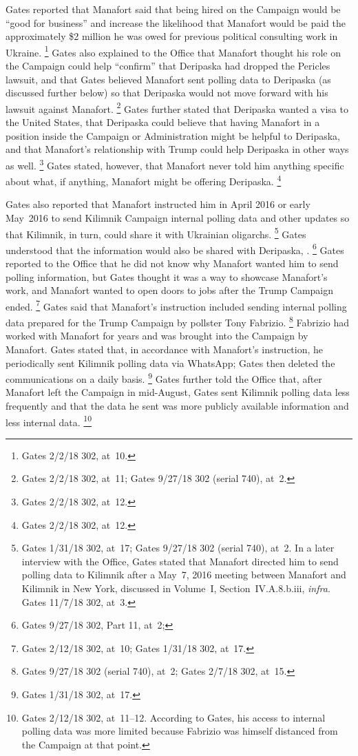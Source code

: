 Gates reported that Manafort said that being hired on the Campaign would be ``good for business'' and increase the likelihood that Manafort would be paid the approximately \$2 million he was owed for previous political consulting work in Ukraine.%
\footnote{Gates 2/2/18 302, at~10.}
Gates also explained to the Office that Manafort thought his role on the Campaign could help ``confirm'' that Deripaska had dropped the Pericles lawsuit, and that Gates believed Manafort sent polling data to Deripaska (as discussed further below) so that Deripaska would not move forward with his lawsuit against Manafort.%
\footnote{Gates 2/2/18 302, at~11;
Gates 9/27/18 302 (serial 740), at~2.}
Gates further stated that Deripaska wanted a visa to the United States, that Deripaska could believe that having Manafort in a position inside the Campaign or Administration might be helpful to Deripaska, and that Manafort's relationship with Trump could help Deripaska in other ways as well.%
\footnote{Gates 2/2/18 302, at~12.}
Gates stated, however, that Manafort never told him anything specific about what, if anything, Manafort might be offering Deripaska.%
\footnote{Gates 2/2/18 302, at~12.}

Gates also reported that Manafort instructed him in April 2016 or early May~2016 to send Kilimnik Campaign internal polling data and other updates so that Kilimnik, in turn, could share it with Ukrainian oligarchs.%
\footnote{Gates 1/31/18 302, at~17;
Gates 9/27/18 302 (serial 740), at~2.
In a later interview with the Office, Gates stated that Manafort directed him to send polling data to Kilimnik after a May~7, 2016 meeting between Manafort and Kilimnik in New York, discussed in Volume~I, Section~IV.A.8.b.iii, \textit{infra}.
Gates 11/7/18 302, at~3.}
Gates understood that the information would also be shared with Deripaska,
.%
\footnote{Gates 9/27/18 302, Part 11, at~2; }
Gates reported to the Office that he did not know why Manafort wanted him to send polling information, but Gates thought it was a way to showcase Manafort's work, and Manafort wanted to open doors to jobs after the Trump Campaign ended.%
\footnote{Gates 2/12/18 302, at~10;
Gates 1/31/18 302, at~17.}
Gates said that Manafort's instruction included sending internal polling data prepared for the Trump Campaign by pollster Tony Fabrizio.%
\footnote{Gates 9/27/18 302 (serial 740), at~2;
Gates 2/7/18 302, at~15.}
Fabrizio had worked with Manafort for years and was brought into the Campaign by Manafort.
Gates stated that, in accordance with Manafort's instruction, he periodically sent Kilimnik polling data via WhatsApp; Gates then deleted the communications on a daily basis.%
\footnote{Gates 1/31/18 302, at~17.}
Gates further told the Office that, after Manafort left the Campaign in mid-August, Gates sent Kilimnik polling data less frequently and that the data he sent was more publicly available information and less internal data.%
\footnote{Gates 2/12/18 302, at~11--12.
According to Gates, his access to internal polling data was more limited because Fabrizio was himself distanced from the Campaign at that point.}

